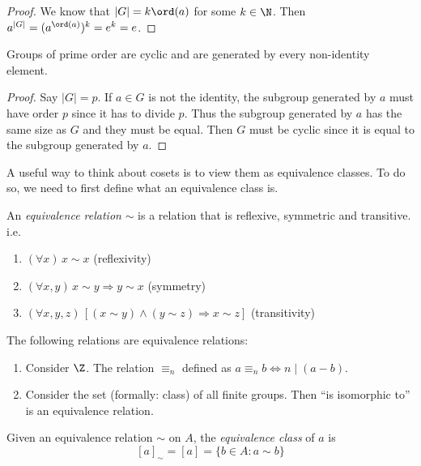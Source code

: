 \documentclass[a4paper]{article}
\begin{document}
\begin{proof}
  We know that $|G| = k\ord(a)$ for some $k\in \N$. Then $a^{|G|} = (a^{\ord(a)})^k = e^k = e$.
\end{proof}

\begin{cor}
  Groups of prime order are cyclic and are generated by every non-identity element.
\end{cor}

\begin{proof}
  Say $|G| = p$. If $a\in G$ is not the identity, the subgroup generated by $a$ must have order $p$ since it has to divide $p$. Thus the subgroup generated by $a$ has the same size as $G$ and they must be equal. Then $G$ must be cyclic since it is equal to the subgroup generated by $a$.
\end{proof}

A useful way to think about cosets is to view them as equivalence classes. To do so, we need to first define what an equivalence class is.
\begin{defi}
  An \emph{equivalence relation} $\sim$ is a relation that is reflexive, symmetric and transitive. i.e.
  \begin{enumerate}
    \item $(\forall x)\,x\sim x$ \hfill (reflexivity)
    \item $(\forall x, y)\,x\sim y \Rightarrow y\sim x$ \hfill (symmetry)
    \item $(\forall x, y, z)\,[(x\sim y) \wedge (y\sim z)\Rightarrow x\sim z]$ \hfill (transitivity)
  \end{enumerate}
\end{defi}

\begin{eg}
  The following relations are equivalence relations:
  \begin{enumerate}
    \item Consider $\Z$. The relation $\equiv_n$ defined as $a\equiv_n b \Leftrightarrow n \mid (a - b)$.
    \item Consider the set (formally: class) of all finite groups. Then ``is isomorphic to'' is an equivalence relation.
  \end{enumerate}
\end{eg}

\begin{defi}
  Given an equivalence relation $\sim$ on $A$, the \emph{equivalence class} of $a$ is
  \[
    [a]_{\sim} = [a] = \{b\in A: a\sim b\}
  \]
\end{defi}
\end{document}

